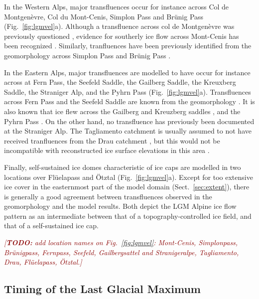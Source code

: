 \documentclass[tc, manuscript]{copernicus}
\newcommand{\todo}[1]{\textcolor{darkred}{\emph{[\textbf{TODO:} #1]}}}
\begin{document}
    In the Western Alps, major transfluences occur for instance across Col de
    Montgenèvre, Col du Mont-Cenis, Simplon Pass and Brünig Pass
    (Fig.~\ref{fig:lgmvel}a). Although a transfluence across col de Montgenèvre
    was previously questioned \citep[Fig.~2]{Cossart.etal.2012}, evidence for
    southerly ice flow across Mont-Cenis has been recognized
    \citep[Fig.~3.18]{Onde.1938, Coutterand.2010}. Similarly, tranfluences have
    been previously identified from the geomorphology across Simplon Pass
    \citep{Kelly.etal.2004} and Brünig Pass \citep{Jackli.1962}.

    In the Eastern Alps, major transfluences are modelled to have occur for
    instance across at Fern Pass, the Seefeld Saddle, the Gailberg Saddle, the
    Kreuxberg Saddle, the Straniger Alp, and the Pyhrn Pass
    (Fig.~\ref{fig:lgmvel}a). Transfluences across Fern Pass and the Seefeld
    Saddle are known from the geomorphology
    \citep[Fig.~2.4]{Penck.Bruckner.1909, Husen.2011}. It is also known that
    ice flew across the Gailberg and Kreuzberg saddles \citep{Husen.1985}, and
    the Pyhrn Pass \citep[Fig.~\ref{fig:lgmvel}a; cf.][Fig.~2.5]{Husen.2011}.
    On the other hand, no transfluence has previously been documented at the
    Straniger Alp. The Tagliamento catchment is usually assumed to not have
    received tranfluences from the Drau catchment \citep{Monegato.etal.2007},
    but this would not be incompatible with reconstructed ice surface
    elevations in this area \citep{Husen.1987}.

    Finally, self-sustained ice domes characteristic of ice caps are modelled
    in two locations over Flüelapass and Ötztal (Fig.~\ref{fig:lgmvel}a).
    Except for too extensive ice cover in the easternmost part of the model
    domain (Sect.~\ref{sec:extent}), there is generally a good agreement
    between transfluences observed in the geomorphology and the model results.
    Both depict the LGM Alpine ice flow pattern as an intermediate between that
    of a topography-controlled ice field, and that of a self-sustained ice cap.

    \todo{add location names on Fig.~\ref{fig:lgmvel}: Mont-Cenis, Simplonpass,
          Brünigpass, Fernpass, Seefeld, Gailbergsattel and Stranigeralpe,
          Tagliamento, Drau, Flüelapass, Ötztal.}


\subsection{Timing of the Last Glacial Maximum}
\label{sec:timing}
\end{document}
